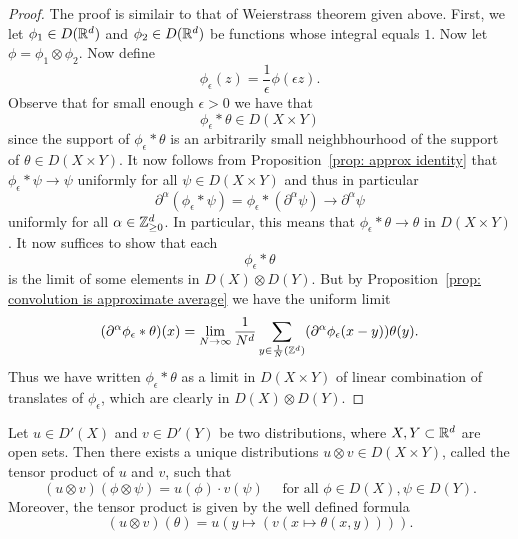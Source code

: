 \documentclass[twoside, a4paper, 10pt]{amsart}
\begin{document}
\begin{proof} The proof is similair to that of Weierstrass theorem given above. First, we let $\phi_1 \in D(\mathbb{R}^d)$ and $\phi_2 \in D(\mathbb{R}^d)$ be functions whose integral equals $1$. Now let $\phi = \phi_1 \otimes \phi_2$. Now define $$\phi_{\epsilon}(z) = \frac{1}{\epsilon} \phi(\epsilon z).$$ Observe that for small enough $\epsilon>0$ we have that $$\phi_{\epsilon} * \theta \in D(X \times Y)$$ since the support of $\phi_{\epsilon} * \theta$ is an arbitrarily small neighbhourhood of the support of $\theta \in D(X \times Y)$. It now follows from Proposition~\ref{prop: approx identity} that $\phi_{\epsilon} * \psi \to \psi$ uniformly for all $\psi \in D(X \times Y)$ and thus in particular  $$\partial^{\alpha} (\phi_{\epsilon}  * \psi) = \phi_{\epsilon} * (\partial^{\alpha} \psi) \to \partial^{\alpha} \psi$$ uniformly for all $\alpha \in \mathbb{Z}^d_{\geq 0}$. In particular, this means that $\phi_{\epsilon} * \theta \to \theta$ in $D(X \times Y)$. It now suffices to show that each $$\phi_{\epsilon} * \theta $$ is the limit of some elements in $D(X) \otimes D(Y)$. But by Proposition~\ref{prop: convolution is approximate average}  we have the uniform limit $$(\partial^{\alpha}\phi_{\epsilon} * \theta) (x) = \lim_{N \to \infty} \frac{1}{N^d} \sum_{y \in \frac{1}{N}(\mathbb{Z}^d)} (\partial^{\alpha} \phi_{\epsilon}(x-y)) \theta(y).$$ Thus we have written $\phi_{\epsilon} * \theta$ as a limit in $D(X \times Y)$ of linear combination of translates of $\phi_{\epsilon}$, which are clearly in $D(X) \otimes D(Y)$.\end{proof}

\begin{thm} Let $u \in D'(X)$ and $v \in D'(Y)$ be two distributions, where $X,Y \subset \mathbb{R}^d$ are open sets. Then there exists a unique distributions $u \otimes v \in D(X \times Y)$, called the tensor product of $u$ and $v$, such that $$(u \otimes v)(\phi \otimes \psi) = u(\phi) \cdot v( \psi) \quad \text{ for all } \phi \in D(X), \psi \in D(Y).$$ Moreover, the tensor product is given by the well defined formula $$(u \otimes v)(\theta) = u(y \mapsto (v(x \mapsto \theta(x,y)))).$$ 

\end{thm}
\end{document}
